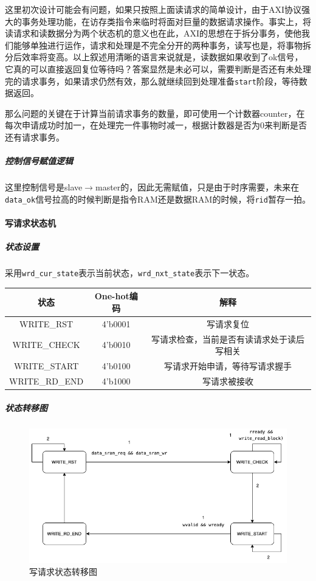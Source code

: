 \documentclass[UTF-8,twoside,c5size]{ctexart}
\begin{document}
	这里初次设计可能会有问题，如果只按照上面读请求的简单设计，由于AXI协议强大的事务处理功能，在访存类指令来临时将面对巨量的数据请求操作。事实上，将读请求和读数据分为两个状态机的意义也在此，AXI的思想在于拆分事务，使他我们能够单独进行运作，请求和处理是不完全分开的两种事务，读写也是，将事物拆分后效率将变高。以上叙述用清晰的语言来说就是，读数据如果收到了ok信号，它真的可以直接返回复位等待吗？答案显然是未必可以，需要判断是否还有未处理完的请求事务，如果请求仍然有效，那么就继续回到处理准备\texttt{start}阶段，等待数据返回。
	
	那么问题的关键在于计算当前请求事务的数量，即可使用一个计数器counter，在每次申请成功时加一，在处理完一件事物时减一，根据计数器是否为0来判断是否还有请求事务。
	
	\subparagraph{控制信号赋值逻辑}\hfill
	
	这里控制信号是slave$\rightarrow$master的，因此无需赋值，只是由于时序需要，未来在\texttt{data_ok}信号拉高的时候判断是指令RAM还是数据RAM的时候，将\texttt{rid}暂存一拍。
	
	\paragraph{写请求状态机}\hfill
	
	\subparagraph{状态设置}\hfill
	
	采用\texttt{wrd_cur_state}表示当前状态，\texttt{wrd_nxt_state}表示下一状态。
	
	\begin{center}
	\begin{tabular}{|c|c|c|}
	\hline
  	\textbf{状态} & \textbf{One-hot编码} & \textbf{解释} \\
  	\hline
	WRITE_RST & 4'b0001 & 写请求复位 \\
	\hline
	WRITE_CHECK & 4'b0010 & 写请求检查，当前是否有读请求处于读后写相关 \\
	\hline
	WRITE_START & 4'b0100 & 写请求开始申请，等待写请求握手 \\
	\hline
	WRITE_RD_END & 4'b1000 & 写请求被接收 \\
	\hline
	\end{tabular}
	\end{center}
	
	\subparagraph{状态转移图}\hfill
	
	\begin{figure}[h]
		\centering
		\includegraphics[width=0.75\linewidth]{figures/WRD.png}
		\caption[rreq_status]{写请求状态转移图}
		\label{fig:rreq_status}
	\end{figure}
	
\end{document}
